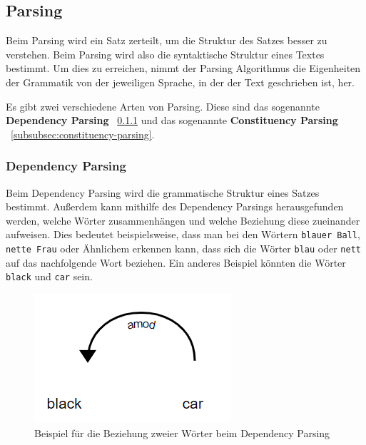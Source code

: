 \subsection{Parsing}\label{subsec:parsing}

Beim Parsing wird ein Satz zerteilt, um die Struktur des Satzes besser zu verstehen.
Beim Parsing wird also die syntaktische Struktur eines Textes bestimmt.
Um dies zu erreichen, nimmt der Parsing Algorithmus die Eigenheiten der Grammatik von der jeweiligen Sprache, in der der Text geschrieben ist, her.\cite{textAnalysisMonkeylearn}

Es gibt zwei verschiedene Arten von Parsing.
Diese sind das sogenannte \textbf{Dependency Parsing} ~\ref{subsubsec:dependency-parsing} und das sogenannte \textbf{Constituency Parsing} ~\ref{subsubsec:constituency-parsing}.

\subsubsection{Dependency Parsing}\label{subsubsec:dependency-parsing}

Beim Dependency Parsing wird die grammatische Struktur eines Satzes bestimmt.
Außerdem kann mithilfe des Dependency Parsings herausgefunden werden, welche Wörter zusammenhängen und welche Beziehung diese zueinander aufweisen.
Dies bedeutet beispielsweise, dass man bei den Wörtern \texttt{blauer Ball}, \texttt{nette Frau} oder Ähnlichem erkennen kann, dass sich die Wörter \texttt{blau} oder \texttt{nett} auf das nachfolgende Wort beziehen.
Ein anderes Beispiel könnten die Wörter \texttt{black} und \texttt{car} sein.

\begin{figure}[hbt!]
    \centering
    \includegraphics[scale=1]{pics/dependency_parsing}
    \caption{Beispiel für die Beziehung zweier Wörter beim Dependency Parsing~\cite{dependencyParsing}}
    \label{fig:dependency_parsing_relation}
\end{figure}

